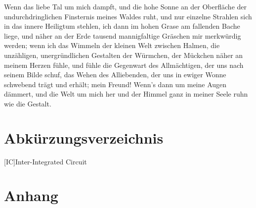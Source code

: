 \documentclass[a4paper,12pt]{article}
\begin{document}
Wenn das liebe Tal um mich dampft, und die hohe Sonne an der Oberfläche der undurchdringlichen Finsternis meines Waldes ruht, und nur einzelne Strahlen sich in das innere Heiligtum stehlen, ich dann im hohen Grase am fallenden Bache liege, und näher an der Erde tausend mannigfaltige Gräschen mir merkwürdig werden; wenn ich das Wimmeln der kleinen Welt zwischen Halmen, die unzähligen, unergründlichen Gestalten der Würmchen, der Mückchen näher an meinem Herzen fühle, und fühle die Gegenwart des Allmächtigen, der uns nach seinem Bilde schuf, das Wehen des Alliebenden, der uns in ewiger Wonne schwebend trägt und erhält; mein Freund! Wenn's dann um meine Augen dämmert, und die Welt um mich her und der Himmel ganz in meiner Seele ruhn wie die Gestalt.
\newpage
{}
\tableofcontents
\newpage

\newpage
{}
\printbibliography
\newpage
\renewcommand{\indexname}{Stichwortverzeichnis}
\printindex
{}
\newpage
\section*{Abkürzungsverzeichnis}
\begin{acronym}[Bash] %
 [IC]{Inter-Integrated Circuit}
\end{acronym}
\newpage
{}
\listoffigures
\newpage
{}
\listoftables
\newpage
\section*{Anhang}
\end{document}
